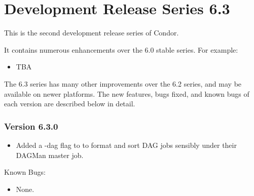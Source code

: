 \section{\label{sec:History-6-3}Development Release Series 6.3}

This is the second development release series of Condor.

It contains numerous enhancements over the 6.0 stable series.
For example:

\begin{itemize}
\item TBA
\end{itemize}

The 6.3 series has many other improvements over the 6.2 series, and
may be available on newer platforms.  The new features, bugs fixed,
and known bugs of each version are described below in detail.

\subsubsection{\label{sec:New-6-3-0}Version 6.3.0}

\begin{itemize}

\item Added a -dag flag to  to format and sort DAG jobs
sensibly under their DAGMan master job.

\end{itemize}

\noindent Known Bugs:

\begin{itemize}

\item None.

\end{itemize}
